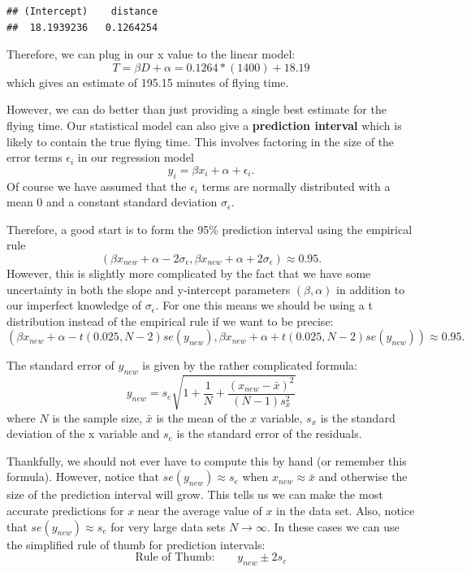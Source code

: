 \documentclass[
]{book}
\newenvironment{Shaded}{\begin{snugshade}}{\end{snugshade}}
\newcommand{\NormalTok}[1]{#1}
\newcommand{\SpecialCharTok}[1]{\textcolor[rgb]{0.00,0.00,0.00}{#1}}
\theoremstyle{definition}
\theoremstyle{definition}
\theoremstyle{definition}
\theoremstyle{definition}
\theoremstyle{remark}
\begin{document}
\begin{Shaded}
\end{Shaded}

\begin{verbatim}
## (Intercept)    distance 
##  18.1939236   0.1264254
\end{verbatim}

Therefore, we can plug in our x value to the linear model: \[ T=\beta D+\alpha=0.1264*(1400)+18.19 \] which gives an estimate of 195.15 minutes of flying time.

However, we can do better than just providing a single best estimate for the flying time. Our statistical model can also give a \textbf{prediction interval} which is likely to contain the true flying time. This involves factoring in the size of the error terms \(\epsilon_i\) in our regression model \[y_i=\beta x_i+ \alpha+\epsilon_i.\] Of course we have assumed that the \(\epsilon_i\) terms are normally distributed with a mean 0 and a constant standard deviation \(\sigma_\epsilon\).

Therefore, a good start is to form the 95\% prediction interval using the empirical rule \[(\beta x_{new} + \alpha-2\sigma_\epsilon, \beta x_{new} + \alpha+2 \sigma_\epsilon)\approx 0.95.\] However, this is slightly more complicated by the fact that we have some uncertainty in both the slope and y-intercept parameters \((\beta, \alpha)\) in addition to our imperfect knowledge of \(\sigma_\epsilon\). For one this means we should be using a t distribution instead of the empirical rule if we want to be precise:
\[(\beta x_{new} + \alpha-t(0.025, N-2) se(y_{new}), \beta x_{new} + \alpha+t(0.025, N-2) se(y_{new}))\approx 0.95.\]

The standard error of \(y_{new}\) is given by the rather complicated formula:
\[y_{new}=s_e \sqrt{1+\frac{1}{N}+\frac{(x_{new}-\bar{x})^2}{(N-1) s_x^2}}\] where \(N\) is the sample size, \(\bar{x}\) is the mean of the \(x\) variable, \(s_x\) is the standard deviation of the x variable and \(s_e\) is the standard error of the residuals.

Thankfully, we should not ever have to compute this by hand (or remember this formula). However, notice that \(se(y_{new})\approx s_e\) when \(x_{new}\approx\bar{x}\) and otherwise the size of the prediction interval will grow. This tells us we can make the most accurate predictions for \(x\) near the average value of \(x\) in the data set. Also, notice that \(se(y_{new})\approx s_e\) for very large data sets \(N\rightarrow \infty\). In these cases we can use the simplified rule of thumb for prediction intervals: \[ \text{Rule of Thumb:}\qquad y_{new} \pm 2 s_e\]
\end{document}
